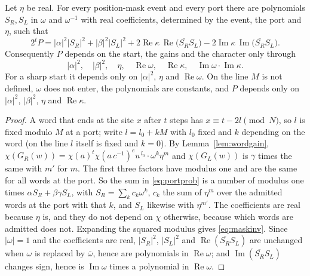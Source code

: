 \begin{proposition}\label{prop:maskinv}
Let $\eta$ be real. For every position-mask event and every port there are polynomials $S_R,S_L$ in $\omega$ and $\omega^{-1}$ with real coefficients, determined by the event, the port and $\eta$, such that
\begin{equation}\label{eq:maskinv}
2^{t}P=|\alpha|^{2}|S_R|^{2}+|\beta|^{2}|S_L|^{2}+2\operatorname{Re}\kappa\,\operatorname{Re}\bigl(\overline{S_R}S_L\bigr)-2\operatorname{Im}\kappa\,\operatorname{Im}\bigl(\overline{S_R}S_L\bigr).
\end{equation}
Consequently $P$ depends on the start, the gains and the character only through
\[
|\alpha|^{2},\quad|\beta|^{2},\quad\eta,\quad\operatorname{Re}\omega,\quad\operatorname{Re}\kappa,\quad\operatorname{Im}\omega\cdot\operatorname{Im}\kappa .
\]
For a sharp start it depends only on $|\alpha|^{2}$, $\eta$ and $\operatorname{Re}\omega$. On the line $M$ is not defined, $\omega$ does not enter, the polynomials are constants, and $P$ depends only on $|\alpha|^{2}$, $|\beta|^{2}$, $\eta$ and $\operatorname{Re}\kappa$.
\end{proposition}
\begin{proof}
A word that ends at the site $x$ after $t$ steps has $x\equiv t-2l \pmod N$, so $l$ is fixed modulo $M$ at a port; write $l=l_0+kM$ with $l_0$ fixed and $k$ depending on the word (on the line $l$ itself is fixed and $k=0$). By Lemma~\ref{lem:wordgain}, $\chi(G_R(w))=\chi(a)^{t}\chi(a\,c^{-1})^{e}u^{\,l_0}\cdot\omega^{k}\eta^{m}$ and $\chi(G_L(w))$ is $\gamma$ times the same with $m'$ for $m$. The first three factors have modulus one and are the same for all words at the port. So the sum in \eqref{eq:portprob} is a number of modulus one times $\alpha S_R+\beta\gamma S_L$, with $S_R=\sum_k c_k\omega^{k}$, $c_k$ the sum of $\eta^{m}$ over the admitted words at the port with that $k$, and $S_L$ likewise with $\eta^{m'}$. The coefficients are real because $\eta$ is, and they do not depend on $\chi$ otherwise, because which words are admitted does not. Expanding the squared modulus gives \eqref{eq:maskinv}. Since $|\omega|=1$ and the coefficients are real, $|S_R|^{2}$, $|S_L|^{2}$ and $\operatorname{Re}(\overline{S_R}S_L)$ are unchanged when $\omega$ is replaced by $\bar\omega$, hence are polynomials in $\operatorname{Re}\omega$; and $\operatorname{Im}(\overline{S_R}S_L)$ changes sign, hence is $\operatorname{Im}\omega$ times a polynomial in $\operatorname{Re}\omega$.
\end{proof}

